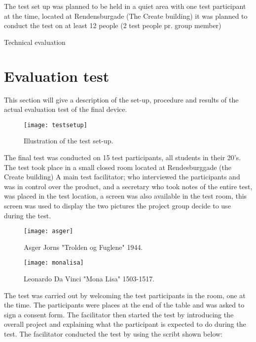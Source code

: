 The test set up was planned to be held in a quiet area with one test participant at the time, located at Rendensburgade (The Create building) it was planned to conduct the test on at least 12 people (2 test people pr. group member) 


Technical evaluation 



\section{Evaluation test}
This section will give a description of the set-up, procedure and results of the actual evaluation test of the final device. 

\begin{figure}[!h] 
\centering
\texttt{[image: testsetup]}
\caption{\label{fig:testsetup} Illustration of the test set-up.}
\end{figure}

The final test was conducted on 15 test participants, all students in their 20's.   The test took place in a small closed room located at Rendesburggade (the Create building) A main test facilitator; who interviewed the participants and was in control over the product, and a secretary who took notes of the entire test, was placed in the test location, a screen was also available in the test room, this screen was used to display the two pictures the project group decide to use during the test.

\begin{figure}[!h] 
\centering
\texttt{[image: asger]}
\caption{\label{fig:asger} Asger Jorns "Trolden og Fuglene" 1944.}
\end{figure}

\begin{figure}[!h] 
\centering
\texttt{[image: monalisa]}
\caption{\label{fig:monalisa} Leonardo Da Vinci "Mona Lisa" 1503-1517.}
\end{figure}

The test was carried out by welcoming the test participants in the room, one at the time. The participants were places at the end of the table and was asked to sign a consent form. The facilitator then started the test by introducing the overall project and explaining what the participant is expected to do during the test. The facilitator conducted the test by using the scribt shown below:


